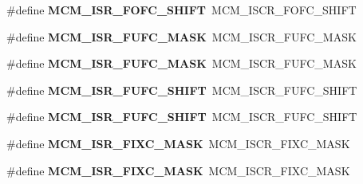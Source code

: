 \begin{DoxyCompactItemize}
\item 
\#define {\bfseries M\+C\+M\+\_\+\+I\+S\+R\+\_\+\+F\+O\+F\+C\+\_\+\+S\+H\+I\+FT}~M\+C\+M\+\_\+\+I\+S\+C\+R\+\_\+\+F\+O\+F\+C\+\_\+\+S\+H\+I\+FT\hypertarget{group__Backward__Compatibility__Symbols_ga2140808617bd0d532f24a58a16eb87d7}{}\label{group__Backward__Compatibility__Symbols_ga2140808617bd0d532f24a58a16eb87d7}

\item 
\#define {\bfseries M\+C\+M\+\_\+\+I\+S\+R\+\_\+\+F\+U\+F\+C\+\_\+\+M\+A\+SK}~M\+C\+M\+\_\+\+I\+S\+C\+R\+\_\+\+F\+U\+F\+C\+\_\+\+M\+A\+SK\hypertarget{group__Backward__Compatibility__Symbols_ga57b83edf81529b3aeb0bcd71246d94db}{}\label{group__Backward__Compatibility__Symbols_ga57b83edf81529b3aeb0bcd71246d94db}

\item 
\#define {\bfseries M\+C\+M\+\_\+\+I\+S\+R\+\_\+\+F\+U\+F\+C\+\_\+\+M\+A\+SK}~M\+C\+M\+\_\+\+I\+S\+C\+R\+\_\+\+F\+U\+F\+C\+\_\+\+M\+A\+SK\hypertarget{group__Backward__Compatibility__Symbols_ga57b83edf81529b3aeb0bcd71246d94db}{}\label{group__Backward__Compatibility__Symbols_ga57b83edf81529b3aeb0bcd71246d94db}

\item 
\#define {\bfseries M\+C\+M\+\_\+\+I\+S\+R\+\_\+\+F\+U\+F\+C\+\_\+\+S\+H\+I\+FT}~M\+C\+M\+\_\+\+I\+S\+C\+R\+\_\+\+F\+U\+F\+C\+\_\+\+S\+H\+I\+FT\hypertarget{group__Backward__Compatibility__Symbols_gaba14f9ecb4d3e66eae0b4bf05d89bbdb}{}\label{group__Backward__Compatibility__Symbols_gaba14f9ecb4d3e66eae0b4bf05d89bbdb}

\item 
\#define {\bfseries M\+C\+M\+\_\+\+I\+S\+R\+\_\+\+F\+U\+F\+C\+\_\+\+S\+H\+I\+FT}~M\+C\+M\+\_\+\+I\+S\+C\+R\+\_\+\+F\+U\+F\+C\+\_\+\+S\+H\+I\+FT\hypertarget{group__Backward__Compatibility__Symbols_gaba14f9ecb4d3e66eae0b4bf05d89bbdb}{}\label{group__Backward__Compatibility__Symbols_gaba14f9ecb4d3e66eae0b4bf05d89bbdb}

\item 
\#define {\bfseries M\+C\+M\+\_\+\+I\+S\+R\+\_\+\+F\+I\+X\+C\+\_\+\+M\+A\+SK}~M\+C\+M\+\_\+\+I\+S\+C\+R\+\_\+\+F\+I\+X\+C\+\_\+\+M\+A\+SK\hypertarget{group__Backward__Compatibility__Symbols_ga6d8f4bf99ae7ee26a509ebe76c2ddb78}{}\label{group__Backward__Compatibility__Symbols_ga6d8f4bf99ae7ee26a509ebe76c2ddb78}

\item 
\#define {\bfseries M\+C\+M\+\_\+\+I\+S\+R\+\_\+\+F\+I\+X\+C\+\_\+\+M\+A\+SK}~M\+C\+M\+\_\+\+I\+S\+C\+R\+\_\+\+F\+I\+X\+C\+\_\+\+M\+A\+SK\hypertarget{group__Backward__Compatibility__Symbols_ga6d8f4bf99ae7ee26a509ebe76c2ddb78}{}\label{group__Backward__Compatibility__Symbols_ga6d8f4bf99ae7ee26a509ebe76c2ddb78}


\end{DoxyCompactItemize}
